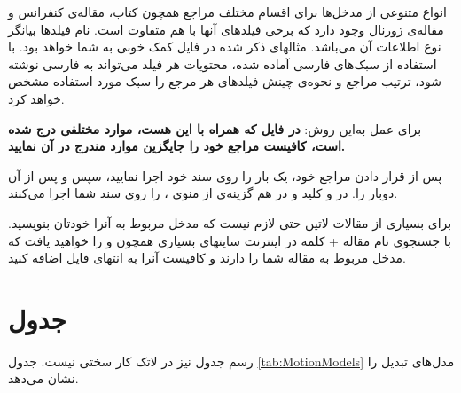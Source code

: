 انواع متنوعی از مدخل‌ها برای اقسام مختلف مراجع همچون کتاب، مقاله‌ی کنفرانس و مقاله‌ی ژورنال وجود دارد که برخی فیلدهای آنها با هم متفاوت است. 
نام فیلدها بیانگر نوع اطلاعات آن می‌باشد. مثالهای ذکر شده در فایل  کمک خوبی به شما خواهد بود. 
با استفاده از سبک‌های فارسی آماده شده، محتویات هر فیلد می‌تواند به فارسی نوشته شود، ترتیب مراجع و نحوه‌ی چینش فیلدهای هر مرجع را سبک مورد استفاده  مشخص خواهد کرد.


برای عمل به‌این روش: 
\textbf{در فایل 
 که همراه با این \پ هست، موارد مختلفی درج شده است، کافیست مراجع خود را جایگزین موارد مندرج در آن نمایید.
}

پس از قرار دادن مراجع خود، یک بار  را روی سند خود اجرا نمایید، سپس  و پس از آن دوبار  را. 
در 
 و
 کلید  و در  هم گزینه‌ی  از منوی ،  را روی سند شما اجرا می‌کنند.

برای بسیاری از مقالات لاتین حتی لازم نیست که مدخل مربوط به آنرا خودتان بنویسید. با جستجوی نام مقاله + کلمه   در اینترنت سایتهای بسیاری همچون  و  را خواهید یافت که مدخل  مربوط به مقاله شما را دارند و کافیست آنرا به انتهای فایل  اضافه کنید.


\section{جدول}
رسم جدول نیز در لاتک کار سختی نیست.  جدول 
\eqref{tab:MotionModels}
مدل‌های تبدیل را نشان می‌دهد.

